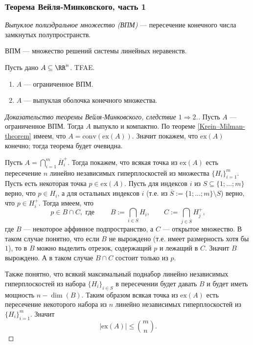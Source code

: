 \documentclass[12pt,a4paper]{article}
\newcommand{\conv}{\ensuremath{\mathrm{conv}}\xspace}
\newcommand{\ex}{\ensuremath{\mathrm{ex}}\xspace}
\begin{document}
    \subsubsection{Теорема Вейля-Минковского, часть 1}

    \begin{definition}
        \emph{Выпуклое полиэдральное множество (ВПМ)} --- пересечение конечного числа замкнутых полупространств.
    \end{definition}

    \begin{remark}
        ВПМ --- множество решений системы линейных неравенств.
    \end{remark}

    \begin{theorem}\label{Weyl-Minkowski-theorem}
        Пусть дано $A \subseteq \RR^n$. TFAE.
        \begin{enumerate}
            \item $A$ --- ограниченное ВПМ.
            \item $A$ --- выпуклая оболочка конечного множества.
        \end{enumerate}
    \end{theorem}

    \begin{proof}[Доказательство теоремы Вейля-Минковского, следствие $1 \Rightarrow 2$.]
        Пусть $A$ --- ограниченное ВПМ. Тогда $A$ выпукло и компактно. По теореме \ref{Krein–Milman-theorem} имеем, что $A = \conv(\ex(A))$. Значит покажем, что $\ex(A)$ конечно; тогда теорема будет очевидна.

        Пусть $A = \bigcap_{i=1}^m \overline{H}_i^+$. Тогда покажем, что всякая точка из $\ex(A)$ есть пересечение $n$ линейно независимых гиперплоскостей из множества $\{H_i\}_{i=1}^m$. Пусть есть некоторая точка $p \in \ex(A)$. Пусть для индексов $i$ из $S \subseteq \{1; \dots; m\}$ верно, что $p \in H_i$, а для остальных индексов $i$ (т.е. из $\overline{S} := \{1; \dots; m\} \setminus S$) верно, что $p \in H_i^+$. Тогда имеем, что
        \[
            p \in B \cap C, \text{ где } \qquad
            B := \bigcap_{i \in S} H_i, \qquad
            C := \bigcap_{j \in \overline{S}} H_j^+,
        \]
        где $B$ --- некоторое аффинное подпространство, а $C$ --- открытое множество. В таком случае понятно, что если $B$ не вырождено (т.е. имеет размерность хотя бы $1$), то в $B$ можно выделить отрезок, содержащий $p$ и лежащий в $C$. Значит $B$ вырождено. А в таком случае $B \cap C$ состоит только из $p$.
        
        Также понятно, что всякий максимальный поднабор линейно независимых гиперплоскостей из набора $\{H_i\}_{i \in S}$ в пересечении будет давать $B$ и будет иметь мощность $n-\dim(B)$. Таким образом всякая точка из $\ex(A)$ есть пересечение некоторого набора из $n$ линейно независимых гиперплоскостей из $\{H_i\}_{i = 1}^m$. Значит
        \[|\ex(A)| \leqslant \binom{m}{n}.\]
    \end{proof}
\end{document}
